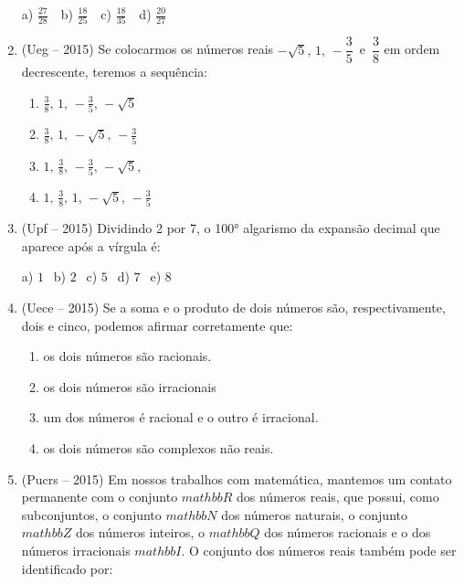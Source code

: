 \begin{multicols*}{2}
\begin{enumerate}
	a) $\frac{27}{28} \ \ \ $ b) $\frac{18}{25} \ \ \ $ c) $\frac{18}{35} \ \ \ $ d) $\frac{20}{27}$

\item (Ueg – 2015) Se colocarmos os números reais $ - \sqrt{5},\, 1,\, - \dfrac{3}{5}\, $ e $\, \dfrac{3}{8}$ em ordem decrescente, teremos a sequência: 

	\begin{enumerate}
	
	\item $\frac{3}{8},\, 1,\,- \frac{3}{5},\, -\sqrt{5}$ 
	\item $\frac{3}{8},\, 1,\,-\sqrt{5},\, - \frac{3}{5}$ 
	\item $1,\, \frac{3}{8},\, - \frac{3}{5},\, -\sqrt{5},$
	\item $1,\, \frac{3}{8},\, 1,\, -\sqrt{5},\, - \frac{3}{5}$

	\end{enumerate}

\item (Upf – 2015) Dividindo 2 por 7, o 100° algarismo da expansão decimal que aparece após a vírgula é: 
	
	a) $ 1 \ \ $ b) $ 2 \ \ $ c) $ 5 \ \ $ d) $ 7 \ \ $ e) $ 8 \ \ $

\item (Uece – 2015) Se a soma e o produto de dois números são, respectivamente, dois e cinco, podemos afirmar corretamente que: 
	
	\begin{enumerate}
			
	\item  os dois números são racionais. 
	\item  os dois números são irracionais 
	\item  um dos números é racional e o outro é irracional. 
	\item  os dois números são complexos não reais. 

	\end{enumerate}

\item (Pucrs – 2015) Em nossos trabalhos com matemática, mantemos um contato permanente com o conjunto $ mathbb{R} $ dos números reais, que possui, como subconjuntos, o conjunto $ mathbb{N} $ dos números naturais, o conjunto $ mathbb{Z} $ dos números inteiros, o $ mathbb{Q} $ dos números racionais e o dos números irracionais $ mathbb{I} $. O conjunto dos números reais também pode ser identificado por: 
	
	\begin{enumerate}		
	

\end{enumerate}
\end{enumerate}
\end{multicols*}
